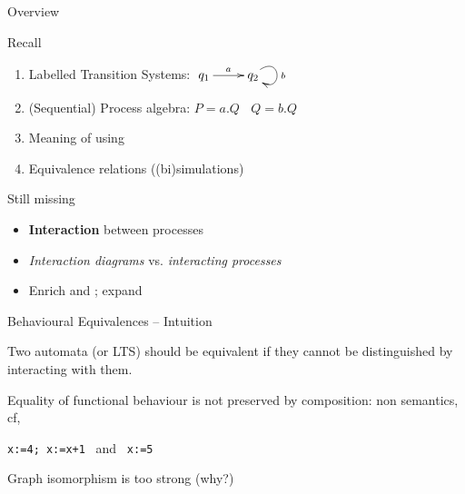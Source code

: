 \documentclass[aspectratio=169]{beamer}
\begin{document}
\frame[plain]{\titlepage}



\begin{slide}{Overview}

\begin{block}{Recall}
\begin{enumerate}
  \item Labelled Transition Systems:
    $\xymatrix{
      q_1 \ar[r]^{a}  & q_2 \ar@(ur,dr)[]^{b} 
    }$

  \item (Sequential) Process algebra:
    $P = a.Q ~~~~ Q=b.Q$

  \item Meaning of  using 

  \item Equivalence relations ((bi)simulations)
\end{enumerate}  
\end{block}

\begin{block}{Still missing}
\begin{itemize}
  \item \alert{\textbf{Interaction}} between processes
  \item \emph{Interaction \alert{diagrams}} vs. \emph{interacting \alert{processes}}
  \item Enrich  and ; expand 
\end{itemize}
\end{block}

\end{slide}



\begin{slide}{Behavioural Equivalences -- Intuition}
\small


Two automata (or LTS) should be \alert{equivalent} if they cannot be distinguished by interacting with them.


\begin{block}{Equality of functional behaviour}
is not preserved by  composition: non  semantics, cf,
\begin{center}
\texttt{x:=4; x:=x+1} ~and~ \texttt{x:=5}
\end{center}
\end{block}

\begin{block}{Graph isomorphism} 
is too strong (why?)
\end{block}

\end{slide}
\end{document}
